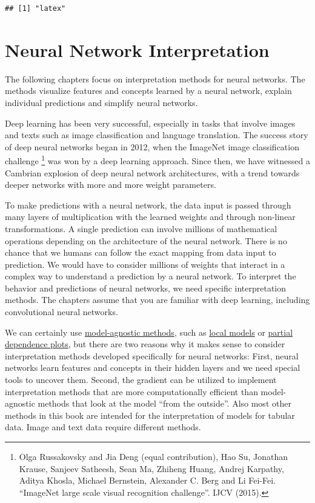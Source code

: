 \documentclass[
  11pt,
]{scrbook}
\begin{document}
\begin{verbatim}
## [1] "latex"
\end{verbatim}

\hypertarget{neural-networks}{%
\chapter{Neural Network Interpretation}\label{neural-networks}}

The following chapters focus on interpretation methods for neural networks.
The methods visualize features and concepts learned by a neural network, explain individual predictions and simplify neural networks.

Deep learning has been very successful, especially in tasks that involve images and texts such as image classification and language translation.
The success story of deep neural networks began in 2012, when the ImageNet image classification challenge \footnote{Olga Russakovsky and Jia Deng (equal contribution), Hao Su, Jonathan Krause, Sanjeev Satheesh, Sean Ma, Zhiheng Huang, Andrej Karpathy, Aditya Khosla, Michael Bernstein, Alexander C. Berg and Li Fei-Fei. ``ImageNet large scale visual recognition challenge''. IJCV (2015).} was won by a deep learning approach.
Since then, we have witnessed a Cambrian explosion of deep neural network architectures, with a trend towards deeper networks with more and more weight parameters.

To make predictions with a neural network, the data input is passed through many layers of multiplication with the learned weights and through non-linear transformations.
A single prediction can involve millions of mathematical operations depending on the architecture of the neural network.
There is no chance that we humans can follow the exact mapping from data input to prediction.
We would have to consider millions of weights that interact in a complex way to understand a prediction by a neural network.
To interpret the behavior and predictions of neural networks, we need specific interpretation methods.
The chapters assume that you are familiar with deep learning, including convolutional neural networks.

We can certainly use \protect\hyperlink{agnostic}{model-agnostic methods}, such as \protect\hyperlink{lime}{local models} or \protect\hyperlink{pdp}{partial dependence plots}, but there are two reasons why it makes sense to consider interpretation methods developed specifically for neural networks:
First, neural networks learn features and concepts in their hidden layers and we need special tools to uncover them.
Second, the gradient can be utilized to implement interpretation methods that are more computationally efficient than model-agnostic methods that look at the model ``from the outside''.
Also most other methods in this book are intended for the interpretation of models for tabular data.
Image and text data require different methods.
\end{document}
